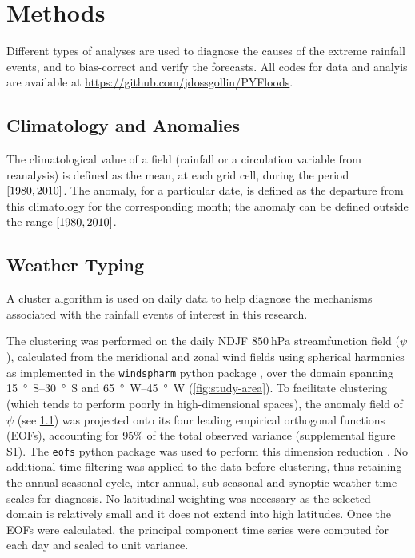 \documentclass[twocol]{ametsoc}
\begin{document}
\section{Methods} \label{sec:methods}

Different types of analyses are used to diagnose the causes of the extreme rainfall events, and to bias-correct and verify the forecasts.
All codes for data and analyis are available at \url{https://github.com/jdossgollin/PYFloods}.

\subsection{Climatology and Anomalies} \label{sec:climatology-anomalies}

The climatological value of a field (rainfall or a circulation variable from reanalysis) is defined as the mean, at each grid cell, during the period $\qty[1980, 2010]$.
The anomaly, for a particular date, is defined as the departure from this climatology for the corresponding month; the anomaly can be defined outside the range $\qty[1980, 2010]$.

\subsection{Weather Typing}

A cluster algorithm is used on daily data to help diagnose the mechanisms associated with the rainfall events of interest in this research.

The clustering was performed on the daily NDJF $\SI{850}{\hecto\pascal}$ streamfunction field ($\psi$), calculated from the meridional and zonal wind fields using spherical harmonics as implemented in the \texttt{windspharm} python package \citep{Dawson:2016ws}, over the domain spanning \SIrange{15}{30}{\degree S} and \SIrange{65}{45}{\degree W} (\cref{fig:study-area}).
To facilitate clustering (which tends to perform poorly in high-dimensional spaces), the anomaly field of $\psi$ (see \cref{sec:climatology-anomalies}) was projected  onto its four leading empirical orthogonal functions (EOFs), accounting for 95\% of the total observed variance (supplemental figure S1).
The \texttt{eofs} python package was used to perform this dimension reduction \citep{Dawson:2016ge}.
No additional time filtering was applied to the data before clustering, thus retaining the annual seasonal cycle, inter-annual, sub-seasonal and synoptic weather time scales for diagnosis.
No latitudinal weighting was necessary as the selected domain is relatively small and it does not extend into high latitudes.
Once the EOFs were calculated, the principal component time series were computed for each day and scaled to unit variance.
\end{document}
